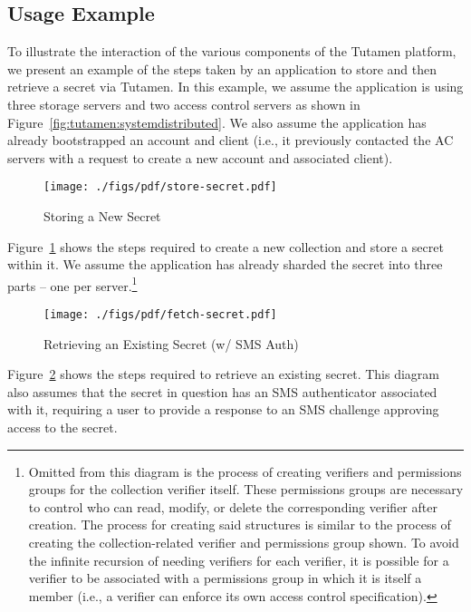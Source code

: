 \subsection{Usage Example}

To illustrate the interaction of the various components of the Tutamen
platform, we present an example of the steps taken by an application
to store and then retrieve a secret via Tutamen. In this example, we
assume the application is using three storage servers and two access
control servers as shown in
Figure~\ref{fig:tutamen:systemdistributed}. We also assume the
application has already bootstrapped an account and client (i.e., it
previously contacted the AC servers with a request to create a new
account and associated client).

\begin{figure}[th]
  \centering
  \texttt{[image: ./figs/pdf/store-secret.pdf]}
  \caption{Storing a New Secret}
  \label{fig:tutamen:storesecret}
\end{figure}

Figure~\ref{fig:tutamen:storesecret} shows the steps required to
create a new collection and store a secret within it. We assume the
application has already sharded the secret into three parts -- one per
server.\footnote{Omitted from this diagram is the process of creating
  verifiers and permissions groups for the collection verifier
  itself. These permissions groups are necessary to control who can
  read, modify, or delete the corresponding verifier after
  creation. The process for creating said structures is similar to the
  process of creating the collection-related verifier and permissions
  group shown. To avoid the infinite recursion of needing verifiers
  for each verifier, it is possible for a verifier to be associated
  with a permissions group in which it is itself a member (i.e., a
  verifier can enforce its own access control specification).}

\begin{figure}[th]
  \centering
  \texttt{[image: ./figs/pdf/fetch-secret.pdf]}
  \caption{Retrieving an Existing Secret (w/ SMS Auth)}
  \label{fig:tutamen:fetchsecret}
\end{figure}

Figure~\ref{fig:tutamen:fetchsecret} shows the steps required to
retrieve an existing secret. This diagram also assumes that the secret
in question has an SMS authenticator associated with it, requiring a
user to provide a response to an SMS challenge approving access to the
secret.

